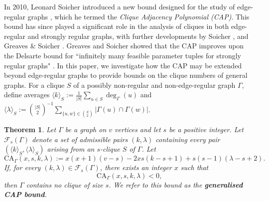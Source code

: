 \documentclass[11pt, baustms]{amsproc}
\theoremstyle{scplain}
\newtheorem{theorem}{Theorem}[section]
\newcommand\CA{\mathrm{CA}}
\begin{document}
In 2010, Leonard Soicher introduced a new bound designed for the study of edge-regular graphs \cite{soicher_more_2010}, which he termed the \emph{Clique Adjacency Polynomial (CAP)}. This bound has since played a significant role in the analysis of cliques in both edge-regular and strongly regular graphs, with further developments by Soicher \cite{soicher_edge_2015}, and Greaves \& Soicher \cite{grv}. Greaves and Soicher showed that the CAP improves upon the Delsarte bound for ``infinitely many feasible parameter tuples for strongly regular graphs" \cite{grv}.
In this paper, we investigate how the CAP may be extended beyond edge-regular graphs to provide bounds on the clique numbers of general graphs.
For a clique $S$ of a possibly non-regular and non-edge-regular graph $\Gamma$, define averages $\langle k\rangle_S:=\frac1{|S|}\sum_{u\in S}\deg_\Gamma(u)$ and $\langle\lambda\rangle_S:=\binom{|S|}{2}^{-1} \sum_{\{u,w\}\in\binom{S}{2}}|\Gamma(u)\cap\Gamma(w)|$.

\begin{theorem}
    \label{gen}   
    Let $\Gamma$ be a graph on $v$ vertices and let $s$ be a positive integer.
    Let \(\mathcal F_s(\Gamma)\) denote a set of admissible pairs \((k,\lambda)\) containing every pair
$\left(\langle k\rangle_S,\langle \lambda\rangle_S\right)$ arising from an \(s\)-clique \(S\) of \(\Gamma\). 
Let
    \begin{equation*}
    \CA_\Gamma(x,s,k,\lambda):=x(x+1)(v-s)-2xs(k-s+1)+s(s-1)(\lambda-s+2).\label{CAP3}
    \end{equation*}
If, for every \((k,\lambda)\in \mathcal F_s(\Gamma)\), there exists an integer \(x\) such that
\[
\CA_\Gamma(x,s,k,\lambda)<0,
\]
then \(\Gamma\) contains no clique of size \(s\).
We refer to this bound as the \textbf{generalised CAP bound}.
        
\end{theorem}
\end{document}
